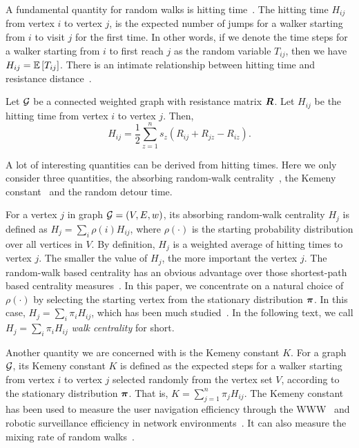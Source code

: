 \documentclass[10pt,journal,compsoc,twocolumn,twoside]{IEEEtran}
\begin{document}
A fundamental quantity for random walks is hitting time~\cite{Lo93,CoBeTeVoKl07}. The hitting time \(H_{ij}\) from vertex \(i\) to vertex \(j\),  is the expected number of jumps for a walker starting  from \(i\) to visit \(j\) for the first time.
In other words, if we denote the time steps for a walker starting from \(i\) to first reach \(j\) as the random variable \(T_{ij}\), then we have \(H_{ij}=\mathbb{E}\left[T_{ij}\right]\).
There is an intimate relationship between hitting time and resistance distance~\cite{Te91}.
\begin{lemma}
    Let \(\mathcal{G}\) be a connected weighted graph with  resistance matrix  \(\boldsymbol{R}\). Let \(H_{ij}\) be the hitting time  from vertex \(i\) to vertex \(j\). Then,
    \begin{equation}\label{EE03}
        H_{ij}=\frac{1}{2}\sum_{z=1}^{n} s_z(R_{ij}+R_{jz}-R_{iz}).
    \end{equation}
\end{lemma}

A lot of interesting quantities can be derived from hitting times. Here we only consider three quantities, the absorbing random-walk centrality~\cite{MaMagi15}, the Kemeny constant~\cite{Hu14} and the random detour time.

For a vertex \(j\) in graph \(\mathcal{G}=(V,E,w)\), its absorbing random-walk centrality \(H_j\) is defined as \(H_j=\sum_{i} \rho(i) H_{ij}\), where \(\rho(\cdot)\) is the starting probability distribution over all vertices in \(V\). By definition, \(H_j\) is a weighted average of hitting times to vertex \(j\). The smaller the value of \(H_j\), the more important the vertex \(j\). The random-walk based centrality has an obvious advantage over those shortest-path based centrality measures~\cite{Ne05}. In this paper, we concentrate on a natural choice of  \(\rho(\cdot)\) by selecting the starting vertex from the stationary distribution \(\boldsymbol{\pi}\). In this case, \(H_j=\sum_{i} \pi_i H_{ij}\), which has been much studied~\cite{TeBeVo09,Be09,Be16}. In the following text, we  call \(H_j=\sum_{i} \pi_i H_{ij}\) \textit{walk centrality} for short.

Another quantity we are concerned with is the Kemeny constant \(K\). For a graph \(\mathcal{G}\), its Kemeny constant \(K\) is defined as the expected steps for a walker starting from  vertex \(i\) to vertex \(j\) selected randomly from the vertex set \(V\), according to the stationary distribution \(\boldsymbol{\pi}\). That is, \(K = \sum_{j = 1}^{n} \pi_j H_{ij}\). The Kemeny constant has been used to measure the user navigation efficiency through the WWW~\cite{LeLo02} and  robotic surveillance efficiency in network environments~\cite{PaAgBu15}. It can also measure the mixing rate of random walks~\cite{LePeWi09}.
\end{document}
